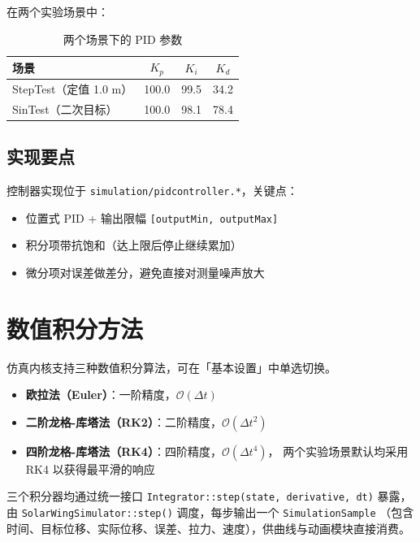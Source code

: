 \documentclass[UTF8, a4paper, fontset=none]{ctexart}
\begin{document}
在两个实验场景中：

\begin{table}[H]
\centering
\begin{tabular}{lccc}
\toprule
场景 & $K_p$ & $K_i$ & $K_d$ \\
\midrule
StepTest（定值 1.0 m） & 100.0 & 99.5 & 34.2 \\
SinTest（二次目标）    & 100.0 & 98.1 & 78.4 \\
\bottomrule
\end{tabular}
\caption{两个场景下的 PID 参数}
\end{table}

\subsection{实现要点}

控制器实现位于 \texttt{simulation/pidcontroller.*}，关键点：

\begin{itemize}[leftmargin=*]
  \item 位置式 PID + 输出限幅 \texttt{[outputMin, outputMax]}
  \item 积分项带抗饱和（达上限后停止继续累加）
  \item 微分项对误差做差分，避免直接对测量噪声放大
\end{itemize}

\section{数值积分方法}

仿真内核支持三种数值积分算法，可在「基本设置」中单选切换。

\begin{itemize}[leftmargin=*]
  \item \textbf{欧拉法（Euler）}：一阶精度，$\mathcal{O}(\Delta t)$
  \item \textbf{二阶龙格-库塔法（RK2）}：二阶精度，$\mathcal{O}(\Delta t^2)$
  \item \textbf{四阶龙格-库塔法（RK4）}：四阶精度，$\mathcal{O}(\Delta t^4)$，
        两个实验场景默认均采用 RK4 以获得最平滑的响应
\end{itemize}

三个积分器均通过统一接口 \texttt{Integrator::step(state, derivative, dt)} 暴露，
由 \texttt{SolarWingSimulator::step()} 调度，每步输出一个 \texttt{SimulationSample}
（包含时间、目标位移、实际位移、误差、拉力、速度），供曲线与动画模块直接消费。
\end{document}
